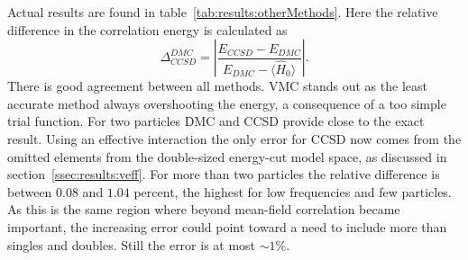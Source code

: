 Actual results are found in table~\ref{tab:results:otherMethods}.
Here the relative difference in the correlation energy is calculated as
\begin{equation}
\label{eq:results:relDiffCcsdDmc}
\Delta_{CCSD}^{DMC} = \left|  \frac{E_{CCSD} - E_{DMC}}{E_{DMC} - \langle \hat{H}_0 \rangle}  \right| .
\end{equation}
There is good agreement between all methods.
VMC stands out as the least accurate method always overshooting the energy, a consequence of a too simple trial function.
For two particles DMC and CCSD provide close to the exact result.
Using an effective interaction the only error for CCSD now comes from the omitted elements from the double-sized energy-cut model space, as discussed in section~\ref{ssec:results:veff}.
For more than two particles the relative difference is between $0.08$ and $1.04$ percent, the highest for low frequencies and few particles.
As this is the same region where beyond mean-field correlation became important, the increasing error could point toward a need to include more than  singles and doubles.
Still the error is at most $\sim 1\%$.
